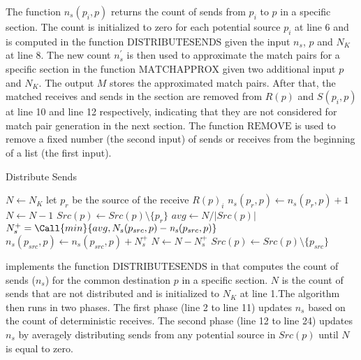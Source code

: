 The function $\mathit{n_s}(p_{i},p)$ returns the count of sends from $p_i$ to $p$ in a specific section. The count is initialized to zero for each potential source $p_i$ at line 6 and is computed in the function $\mathrm{DISTRIBUTESENDS}$ given the input $n_s$, $p$ and $N_K$ at line 8. The new count $n_s^\prime$ is then used to approximate the match pairs for a specific section in the function $\mathrm{MATCHAPPROX}$ given two additional input $p$ and $N_K$.
The output $M$ stores the approximated match pairs. After that, the matched receives and sends in the section are removed from $R(p)$ and $S(p_i,p)$ at line 10 and line 12 respectively, indicating that they are not considered for match pair generation in the next section. The function $\mathrm{REMOVE}$ is used to remove a fixed number (the second input) of sends or receives from the beginning of a list (the first input). 
 

\begin{algorithm}
\caption{Distribute Sends}\label{algo:distribute}
\begin{algorithmic}[1]
\State $N\gets N_K$
\State let $p_{r}$ be the source of the receive $R(p)_i$
\State $\mathit{n_s}(p_{r},p)\gets \mathit{n_s}(p_{r},p)+1$
\State $N\gets N-1$   
\State $Src(p)\gets Src(p)\setminus\{p_{r}\}$
\EndIf
\EndIf
\EndFor
\State $\mathit{avg}\gets N / {|Src(p)|}$
\State $N_s^+ = \Call{min}{avg,N_s(p_{src},p)-\mathit{n_s}(p_{src},p)}$
\State $\mathit{n_s}(p_{src},p)\gets\mathit{n_s}(p_{src},p)+N_s^+$
\State $N\gets N-N_s^+$
\State $Src(p)\gets Src(p)\setminus\{p_{src}\}$
\EndIf
\EndIf
\EndFor
\EndWhile
\end{algorithmic}
\end{algorithm}


 implements the function $\mathrm{DISTRIBUTESENDS}$ in  that computes the count of sends ($n_s$) for the common destination $p$ in a specific section. $N$ is the count of sends that are not distributed and is initialized to $N_K$ at line 1.The algorithm then runs in two phases. The first phase (line 2 to line 11) updates $n_s$ based on the count of deterministic receives. The second phase (line 12 to line 24) updates $n_s$ by averagely distributing sends from any potential source in $Src(p)$ until $N$ is equal to zero. 

